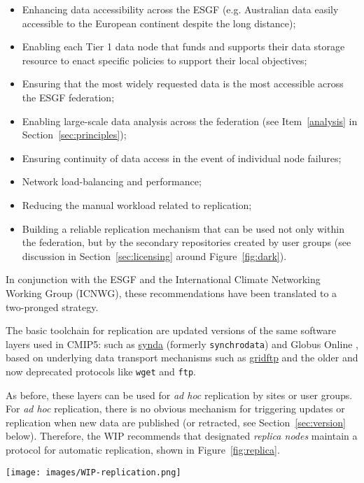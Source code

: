\documentclass[gmd,manuscript]{copernicus}
\newcommand{\pipref}[1] {\citep{ref:#1}}
\newcommand{\figref}[1] {\mbox{Figure   \ref{fig:#1}}}
\newcommand{\secref}[1] {\mbox{Section  \ref{sec:#1}}}
\begin{document}
\begin{itemize}
\item Enhancing data accessibility across the ESGF (e.g. Australian
  data easily accessible to the European continent despite the long
  distance);
\item Enabling each Tier 1 data node that funds and supports their
  data storage resource to enact specific policies to support their
  local objectives;
\item Ensuring that the most widely requested data is the most
  accessible across the ESGF federation;
\item Enabling large-scale data analysis across the federation (see
  Item~\ref{analysis} in \secref{principles});
\item Ensuring continuity of data access in the event of individual node
  failures;
\item Network load-balancing and performance;
\item Reducing the manual workload related to replication;
\item Building a reliable replication mechanism that can be used not
  only within the federation, but by the secondary repositories
  created by user groups (see discussion in \secref{licensing} around
  \figref{dark}).
\end{itemize}

In conjunction with the ESGF and the International Climate Networking
Working Group (ICNWG), these recommendations have been translated to a
two-pronged strategy.

The basic toolchain for replication are updated versions of the same
software layers used in CMIP5: such as
\href{https://github.com/Prodiguer/synda}{synda} (formerly
\texttt{synchrodata}) and Globus Online \pipref{allenetal2012}, based
on underlying data transport mechanisms such as
\href{https://goo.gl/Z8xcfE}{gridftp} and the older and now deprecated
protocols like \texttt{wget} and \texttt{ftp}.

As before, these layers can be used for \emph{ad hoc} replication by
sites or user groups. For \emph{ad hoc} replication, there is no
obvious mechanism for triggering updates or replication when new data
are published (or retracted, see \secref{version} below). Therefore,
the WIP recommends that designated \emph{replica nodes} maintain a
protocol for automatic replication, shown in \figref{replica}.

\begin{figure*}
  \begin{center}
    \texttt{[image: images/WIP-replication.png]}
  \end{center}
  \caption{CMIP6 replication from data nodes to replica centres and
    between replica centres coordinated by a CMIP6 replication team.}
  \label{fig:replica}
\end{figure*}
\end{document}
